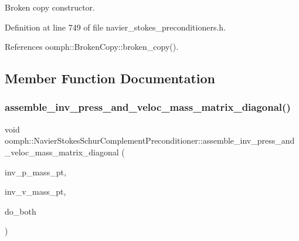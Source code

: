 Broken copy constructor. 



Definition at line 749 of file navier\+\_\+stokes\+\_\+preconditioners.\+h.



References oomph\+::\+Broken\+Copy\+::broken\+\_\+copy().



\subsection{Member Function Documentation}
\mbox{\label{classoomph_1_1NavierStokesSchurComplementPreconditioner_ab45d7496790cc29a056b83c194aa2a1c}} 
\subsubsection{\texorpdfstring{assemble\+\_\+inv\+\_\+press\+\_\+and\+\_\+veloc\+\_\+mass\+\_\+matrix\+\_\+diagonal()}{assemble\_inv\_press\_and\_veloc\_mass\_matrix\_diagonal()}}
{\footnotesize\ttfamily void oomph\+::\+Navier\+Stokes\+Schur\+Complement\+Preconditioner\+::assemble\+\_\+inv\+\_\+press\+\_\+and\+\_\+veloc\+\_\+mass\+\_\+matrix\+\_\+diagonal (\begin{DoxyParamCaption}\item[{\hyperlink{classoomph_1_1CRDoubleMatrix}{C\+R\+Double\+Matrix} $\ast$\&}]{inv\+\_\+p\+\_\+mass\+\_\+pt,  }\item[{\hyperlink{classoomph_1_1CRDoubleMatrix}{C\+R\+Double\+Matrix} $\ast$\&}]{inv\+\_\+v\+\_\+mass\+\_\+pt,  }\item[{const bool \&}]{do\+\_\+both }\end{DoxyParamCaption})\hspace{0.3cm}{\ttfamily [private]}}




